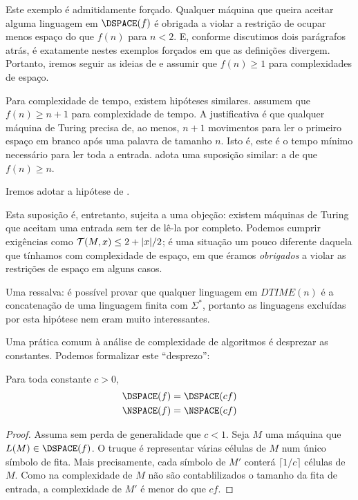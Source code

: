 Este exemplo é admitidamente forçado.
Qualquer máquina que queira aceitar alguma linguagem em $\DSPACE(f)$
é obrigada a violar a restrição de
ocupar menos espaço do que $f(n)$
para $n < 2$.
E, conforme discutimos dois parágrafos atrás,
é exatamente nestes exemplos forçados
em que as definições divergem.
Portanto, iremos seguir as ideias de
e assumir que $f(n) \geq 1$ para complexidades de espaço.

Para complexidade de tempo,
existem hipóteses similares.
assumem que $f(n) \geq n+1$
para complexidade de tempo.
A justificativa é que
qualquer máquina de Turing precisa de,
ao menos,
$n+1$ movimentos para ler o primeiro espaço em branco
após uma palavra de tamanho $n$.
Isto é,
este é o tempo mínimo necessário
para ler toda a entrada.
adota uma suposição similar:
a de que $f(n) \geq n$.

Iremos adotar a hipótese de .

Esta suposição é,
entretanto,
sujeita a uma objeção:
existem máquinas de Turing
que aceitam uma entrada
sem ter de lê-la por completo.
Podemos cumprir exigências como
${\mathcal{T}}(M, x) \leq 2 + |x|/2$;
é uma situação um pouco diferente
daquela que tínhamos com complexidade de espaço,
em que éramos \emph{obrigados}
a violar as restrições de espaço
em alguns casos.

Uma ressalva:
é possível provar que
qualquer linguagem em $DTIME(n)$
é a concatenação de uma linguagem finita
com $\Sigma^*$,
portanto as linguagens excluídas por esta hipótese
nem eram muito interessantes.

Uma prática comum à análise de complexidade de algoritmos
é desprezar as constantes. Podemos formalizar este ``desprezo'':

\begin{theorem}
    Para toda constante $c > 0$,
    \begin{align*}
        \DSPACE(f) & = \DSPACE(cf) \\
        \NSPACE(f) & = \NSPACE(cf)
    \end{align*}
\end{theorem}

\begin{proof}
    Assuma sem perda de generalidade que $c < 1$.
    Seja $M$ uma máquina que $L(M) \in \DSPACE(f)$.
    O truque é representar várias células de $M$
    num único símbolo de fita.
    Mais precisamente,
    cada símbolo de $M'$ conterá
    $\lceil 1/c \rceil$ células de $M$.
    Como na complexidade de $M$
    não são contablilizados o tamanho da fita de entrada,
    a complexidade de $M'$ é menor do que $cf$.
\end{proof}

